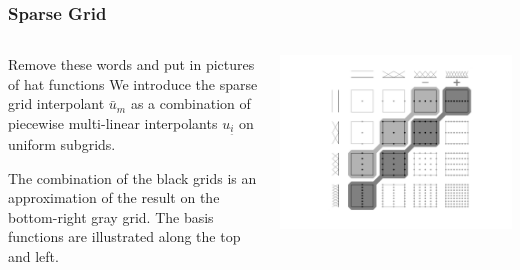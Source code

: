 \documentclass[11pt,ucs]{beamer}
\begin{document}
\begin{frame}\frametitle{Sparse Grid}

\begin{columns}
\begin{column}{0.4\textwidth}
\alert{Remove these words and put in pictures of hat functions}
We introduce the sparse grid interpolant $\bar u_m$ as a combination of piecewise multi-linear interpolants $u_{\underline{i}}$ on uniform subgrids.

\medskip
The combination of the black grids is an approximation of the result on the bottom-right gray grid. The basis functions are illustrated along the top and left.
\end{column}

\begin{column}{0.6\textwidth}

\centering
\includegraphics[width=1.1\textwidth]{combination_linear.png}


\end{column}

\end{columns}

\end{frame}
\end{document}
